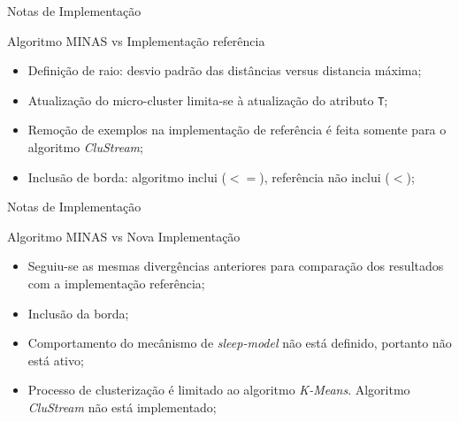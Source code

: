 \documentclass[aspectratio=43,10pt]{beamer}
\begin{document}

\begin{frame}[fragile]{Notas de Implementação}
  \begin{alertblock}{Algoritmo MINAS vs Implementação referência}
    \begin{itemize}%
      \item Definição de raio: desvio padrão das distâncias versus distancia máxima;
      \item Atualização do micro-cluster limita-se à atualização do atributo \texttt{T};
      \item Remoção de exemplos na implementação de referência é feita somente para o algoritmo \textit{CluStream};
      \item Inclusão de borda: algoritmo inclui ($<=$), referência não inclui ($<$);
    \end{itemize}
  \end{alertblock}
\end{frame}
\begin{frame}[fragile]{Notas de Implementação}
  \begin{alertblock}{Algoritmo MINAS vs Nova Implementação}
    \begin{itemize}
      \item Seguiu-se as mesmas divergências anteriores para comparação dos resultados com a implementação referência;
      \item Inclusão da borda;
      \item Comportamento do mecânismo de \textit{sleep-model} não está definido, portanto não está ativo;
      \item Processo de clusterização é limitado ao algoritmo \textit{K-Means}. Algoritmo \textit{CluStream} não está implementado;
    \end{itemize}
  \end{alertblock}
\end{frame}
\end{document}
